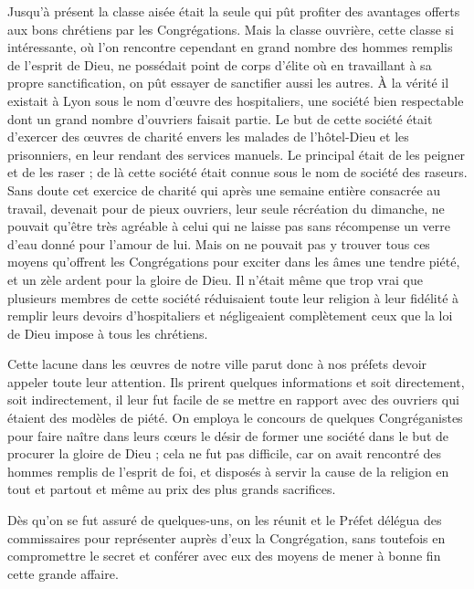 Jusqu'à présent la classe aisée était la seule qui pût profiter des avantages offerts aux bons chrétiens par les Congrégations. Mais la classe ouvrière, cette classe si intéressante, où l'on rencontre cependant en grand nombre des hommes remplis de l'esprit de Dieu, ne possédait point de corps d'élite où en travaillant à sa propre sanctification, on pût essayer de sanctifier aussi les autres. À la vérité il existait à Lyon sous le nom d'œuvre des hospitaliers, une société bien respectable dont un grand nombre d'ouvriers faisait partie. Le but de cette société était d'exercer des œuvres de charité envers les malades de l'hôtel-Dieu et les prisonniers, en leur rendant des services manuels. Le principal était de les peigner et de les raser ; de là cette société était connue sous le nom de société des raseurs. Sans doute cet exercice de charité qui après une semaine entière consacrée au travail, devenait pour de pieux ouvriers, leur seule récréation du dimanche, ne pouvait qu'être très agréable à celui qui ne laisse pas sans récompense un verre d'eau donné pour l'amour de lui. Mais on ne pouvait pas y trouver tous ces moyens qu'offrent les Congrégations pour exciter dans les âmes une tendre piété, et un zèle ardent pour la gloire de Dieu. Il n'était même que trop vrai que plusieurs membres de cette société réduisaient toute leur religion à leur fidélité à remplir leurs devoirs d'hospitaliers et négligeaient complètement ceux que la loi de Dieu impose à tous les chrétiens.

Cette lacune dans les œuvres de notre ville parut donc à nos préfets devoir appeler toute leur attention. Ils prirent quelques
informations et soit directement, soit indirectement, il leur fut facile de se mettre en rapport avec des ouvriers qui étaient des modèles de piété. On employa le concours de quelques Congréganistes pour faire naître dans leurs cœurs le désir de former une société dans le but de procurer la gloire de Dieu ; cela ne fut pas difficile, car on avait rencontré des hommes remplis de l'esprit de foi, et disposés à servir la cause de la religion en tout et partout et même au prix des plus grands sacrifices.

Dès qu'on se fut assuré de quelques-uns, on les réunit et le Préfet délégua des commissaires pour représenter auprès d'eux la Congrégation, sans toutefois en compromettre le secret et conférer avec eux des moyens de mener à bonne fin cette grande affaire.

